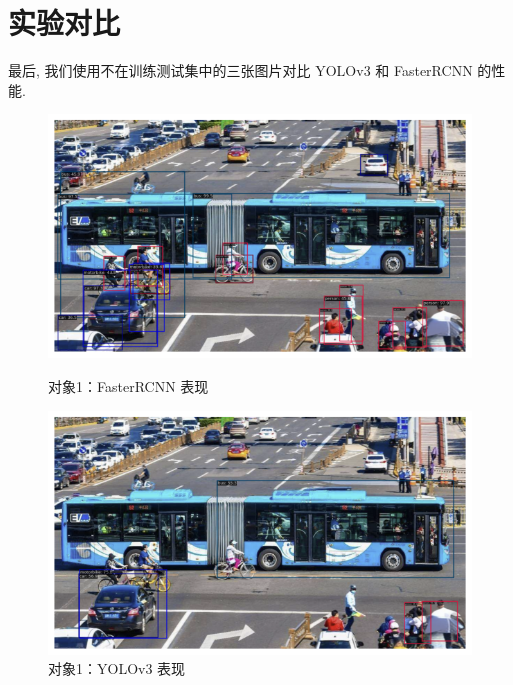 \documentclass[notitlepage,cs4size,punct,oneside]{ctexrep}
\numberwithin{equation}{chapter}
\theoremstyle{mystyle}
\begin{document}
\section{实验对比}

最后, 我们使用不在训练测试集中的三张图片对比 YOLOv3 和 FasterRCNN 的性能.

\begin{figure}[!htpb]
    \centering
    \begin{minipage}[t]{0.49\textwidth}
    \includegraphics[width=\linewidth]{cnntest1.png}
    \caption{对象1：FasterRCNN 表现}
    \label{mAPfrcnn}
    \end{minipage}
    \begin{minipage}[t]{0.49\textwidth}
    \includegraphics[width=\linewidth]{yolotest1.png}
    \caption{对象1：YOLOv3 表现}
    \label{frcnn_loss}
    \end{minipage}
\end{figure}
\end{document}
